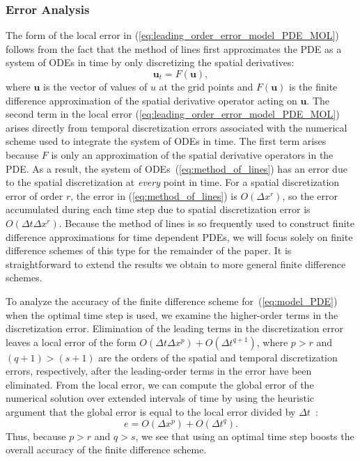 \documentclass[fleqn,12pt,twoside]{article}
\newcommand{\beq}{\begin{equation}}
\newcommand{\eeq}{\end{equation}}
\def\dt{\Delta t}
\def\dx{\Delta x}
\begin{document}
\subsubsection*{\label{sec:error_analysis} 
            Error Analysis}
The form of the local error in 
(\ref{eq:leading_order_error_model_PDE_MOL}) follows from the fact 
that the method of lines first approximates the PDE as a system of ODEs in 
time by only discretizing the spatial derivatives: 
\beq
{\mathbf u}_t = F({\mathbf u}),
\label{eq:method_of_lines}
\eeq
where ${\mathbf u}$ is the vector of values of $u$ at the grid points and
$F({\mathbf u})$ is the finite difference approximation of the spatial 
derivative operator acting on ${\mathbf u}$.  The second term in the local 
error (\ref{eq:leading_order_error_model_PDE_MOL}) arises directly from 
temporal discretization errors associated with the numerical scheme used to 
integrate the system of ODEs in time.  The first term arises because $F$ is 
only an approximation of the spatial derivative operators in the PDE.  As a 
result, the system of ODEs~(\ref{eq:method_of_lines}) has an error due to 
the spatial discretization at \emph{every} point in time.  For a spatial 
discretization error of order $r$, the error in (\ref{eq:method_of_lines}) is 
$O(\dx^r)$, so the error accumulated during each time step due to 
spatial discretization error is $O(\dt \dx^r)$.  Because the method of 
lines is so frequently used to construct finite difference approximations for 
time dependent PDEs, we will focus solely on finite difference schemes of this 
type for the remainder of the paper.  It is straightforward to extend the 
results we obtain to more general finite difference schemes. 

To analyze the accuracy of the finite difference scheme 
for~(\ref{eq:model_PDE}) when the optimal time step is used, we examine the 
higher-order terms in the discretization error.  Elimination of the leading 
terms in the discretization error leaves a local error of the form 
$O(\dt \dx^p) + O(\dt^{q+1})$, where $p>r$ and $(q+1) > (s+1)$ are the orders 
of the spatial and temporal discretization errors, respectively, after the 
leading-order terms in the error have been eliminated.  
From the local error, we can compute the global error of the numerical 
solution over extended intervals of time by using the heuristic 
argument that the global error is equal to the local error divided by 
$\dt$~\cite{gko_book}:
\beq
e = O(\dx^p) + O(\dt^q).
\label{eq:global_error_ots}
\eeq
Thus, because $p > r$ and $q > s$, we see that using an optimal time step 
boosts the overall accuracy of the finite difference scheme.
\end{document}
